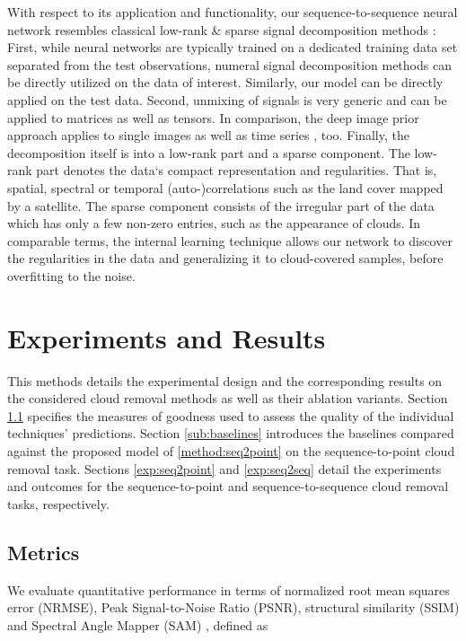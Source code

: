\documentclass[journal]{IEEEtran}
\begin{document}
With respect to its application and functionality, our sequence-to-sequence neural network resembles classical low-rank \& sparse signal decomposition methods \cite{de2001robust, donoho2006compressed, zhu2010tomographic, zhu2012sparse}: First, while neural networks are typically trained on a dedicated training data set separated from the test observations, numeral signal decomposition methods can be directly utilized on the data of interest. Similarly, our model can be directly applied on the test data. Second, unmixing of signals is very generic and can be applied to matrices as well as tensors. In comparison, the deep image prior approach applies to single images as well as time series \cite{ulyanov2018deep, zhang2019internal}, too. Finally, the decomposition itself is into a low-rank part and a sparse component. The low-rank part denotes the data‘s compact representation and regularities. That is, spatial, spectral or temporal (auto-)correlations such as the land cover mapped by a satellite. The sparse component consists of the irregular part of the data which has only a few non-zero entries, such as the appearance of clouds. In comparable terms, the internal learning technique allows our network to discover the regularities in the data and generalizing it to cloud-covered samples, before overfitting to the noise. 


\section{Experiments and Results} \label{experiments}

This methods details the experimental design and the corresponding results on the considered cloud removal methods as well as their ablation variants. 
Section \ref{sub:metrics} specifies the measures of goodness used to assess the quality of the individual techniques' predictions. Section \ref{sub:baselines} introduces the baselines compared against the proposed model of \ref{method:seq2point} on the sequence-to-point cloud removal task. Sections \ref{exp:seq2point} and \ref{exp:seq2seq} detail the experiments and outcomes for the sequence-to-point and sequence-to-sequence cloud removal tasks, respectively.

\subsection{Metrics} \label{sub:metrics}

We evaluate quantitative performance in terms of normalized root mean squares error (NRMSE), Peak Signal-to-Noise Ratio (PSNR), structural similarity (SSIM) \cite{Wang_Bovik_Sheikh_Simoncelli_2004} and Spectral Angle Mapper (SAM) \cite{kruse1993spectral}, defined as
 
\end{document}

